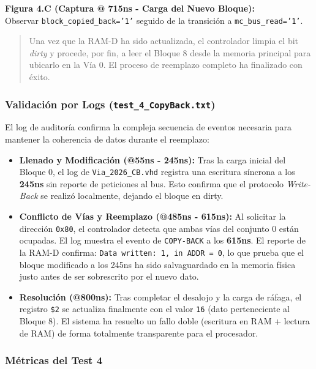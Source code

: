 \documentclass[12pt,a4paper]{article}
\begin{document}
\textbf{Figura 4.C (Captura @ 715ns - Carga del Nuevo Bloque):} \\
Observar \texttt{block\_copied\_back='1'} seguido de la transición a \texttt{mc\_bus\_read='1'}.
\begin{quote}
   Una vez que la RAM-D ha sido actualizada, el controlador limpia el bit \textit{dirty} y procede, por fin, a leer el Bloque 8 desde la memoria principal para ubicarlo en la Vía 0. El proceso de reemplazo completo ha finalizado con éxito.
\end{quote}

\subsubsection{Validación por Logs (\texttt{test\_4\_CopyBack.txt})}

El log de auditoría confirma la compleja secuencia de eventos necesaria para mantener la coherencia de datos durante el reemplazo:

\begin{itemize}
    \item \textbf{Llenado y Modificación (@55ns - 245ns):} Tras la carga inicial del Bloque 0, el log de \texttt{Via\_2026\_CB.vhd} registra una escritura síncrona a los \textbf{245ns} sin reporte de peticiones al bus. Esto confirma que el protocolo \textit{Write-Back} se realizó localmente, dejando el bloque en dirty.
    \item \textbf{Conflicto de Vías y Reemplazo (@485ns - 615ns):} Al solicitar la dirección \texttt{0x80}, el controlador detecta que ambas vías del conjunto 0 están ocupadas. El log muestra el evento de  \texttt{COPY-BACK} a los \textbf{615ns}. El reporte de la RAM-D confirma: \texttt{Data written: 1, in ADDR = 0}, lo que prueba que el bloque modificado a los 245ns ha sido salvaguardado en la memoria física justo antes de ser sobrescrito por el nuevo dato.
    \item \textbf{Resolución (@800ns):} Tras completar el desalojo y la carga de ráfaga, el registro \texttt{\$2} se actualiza finalmente con el valor \texttt{16} (dato perteneciente al Bloque 8). El sistema ha resuelto un fallo doble (escritura en RAM + lectura de RAM) de forma totalmente transparente para el procesador.
\end{itemize}

\subsubsection{Métricas del Test 4}
\end{document}
